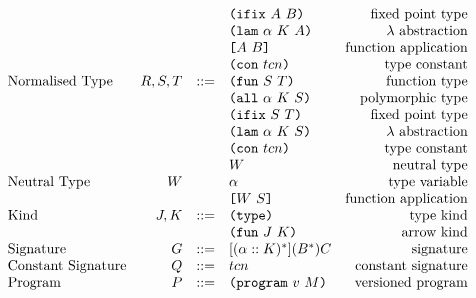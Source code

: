 \documentclass[../plutus-core-specification.tex]{subfiles}
\begin{document}
\begin{minipage}{\linewidth}
\[\begin{array}{lrclr}
                                  &        &     & \texttt{(} \texttt{ifix} ~ A ~ B \texttt{)}                & \textrm{fixed point type}\\
                                  &        &     & \texttt{(} \texttt{lam} ~ \alpha ~ K ~ A \texttt{)}        & \textrm{$\lambda$ abstraction}\\
                                  &        &     & \texttt{[} A ~ B \texttt{]}                & \textrm{function application}\\
                                  &        &     & \texttt{(} \texttt{con} ~ tcn \texttt{)}                 & \textrm{type constant}\\
        \textrm{Normalised Type}  & R,S,T  & ::= & \texttt{(} \texttt{fun} ~ S ~ T \texttt{)}                & \textrm{function type}\\
                                  &        &     & \texttt{(} \texttt{all} ~ \alpha ~ K ~ S \texttt{)}        & \textrm{polymorphic type}\\
                                  &        &     & \texttt{(} \texttt{ifix} ~ S ~ T \texttt{)}                & \textrm{fixed point type}\\
                                  &        &     & \texttt{(} \texttt{lam} ~ \alpha ~ K ~ S \texttt{)}        & \textrm{$\lambda$ abstraction}\\
                                  &        &     & \texttt{(} \texttt{con} ~ tcn \texttt{)}                 & \textrm{type constant}\\
                                  &        &     & W                          & \textrm{neutral type}\\
        \textrm{Neutral Type}     & W      &     & \alpha                     & \textrm{type variable}\\
                                  &        &     & \texttt{[} W ~ S \texttt{]}                & \textrm{function application}\\
        \textrm{Kind}             & J,K    & ::= & \texttt{(} \texttt{type} \texttt{)}{}                   & \textrm{type kind}\\
                                  &        &     & \texttt{(} \texttt{fun} ~ J ~ K \texttt{)}                & \textrm{arrow kind}\\
        \textrm{Signature}        & G      & ::= & [(\alpha :: K)^*](B^*)C     & \textrm{signature}\\
        \textrm{Constant Signature}   & Q      & ::= & tcn                    & \textrm{constant signature}\\
        \textrm{Program}          & P      & ::= & \texttt{(} \texttt{program} ~ v ~ M \texttt{)}             & \textrm{versioned program}\\

    \end{array}\]
    \label{fig:grammar_algorithmic_restricted}
\end{minipage}
\end{document}
